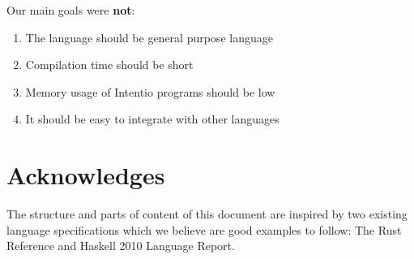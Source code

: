 Our main goals were \textbf{not}:
\begin{enumerate}
  \item The language should be general purpose language
  \item Compilation time should be short
  \item Memory usage of Intentio programs should be low
  \item It should be easy to integrate with other languages
\end{enumerate}

\section*{Acknowledges}

The structure and parts of content of this document are inspired by two existing language specifications which we believe are good examples to follow: The Rust Reference\cite{TheRustReference} and Haskell 2010 Language Report\cite{Marlow_haskell2010}.

